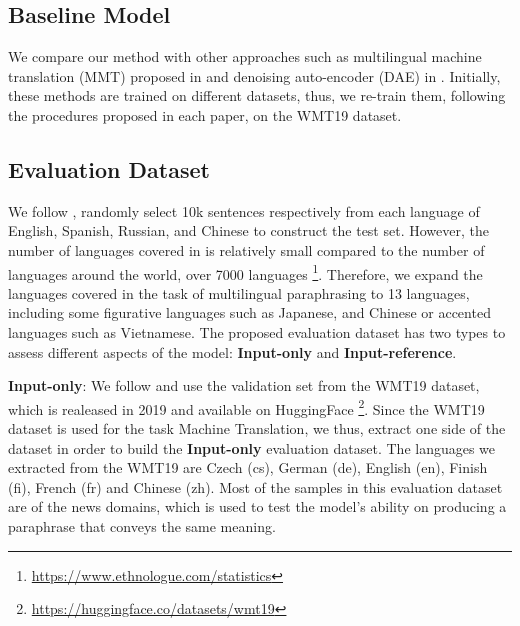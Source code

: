 \documentclass[letterpaper]{article} %
\begin{document}
\subsection{Baseline Model}
We compare our method with other approaches such as multilingual machine translation (MMT) proposed in \citet{thompson-post-2020-paraphrase} and denoising auto-encoder (DAE) in \citet{guo2019zeroshot}. Initially, these methods are trained on different datasets, thus, we re-train them, following the procedures proposed in each paper, on the WMT19 dataset. %

\subsection{Evaluation Dataset}
We follow \citet{guo2019zeroshot}, randomly select 10k sentences respectively from each language of English, Spanish, Russian, and Chinese to construct the test set. However, the number of languages covered in \citet{guo2019zeroshot} is relatively small compared to the number of languages around the world, over 7000 languages \footnote{\url{https://www.ethnologue.com/statistics}}. Therefore, we expand the languages covered in the task of multilingual paraphrasing to 13 languages, including some figurative languages such as Japanese, and Chinese or accented languages such as Vietnamese. The proposed evaluation dataset has two types to assess different aspects of the model: \textbf{Input-only} and \textbf{Input-reference}.

\textbf{Input-only}: We follow \citet{thompson-post-2020-paraphrase} and use the validation set from the WMT19 dataset, which is realeased in 2019 and available on HuggingFace \footnote{\url{https://huggingface.co/datasets/wmt19}}. Since the WMT19 dataset is used for the task Machine Translation, we thus, extract one side of the dataset in order to build the \textbf{Input-only} evaluation dataset. The languages we extracted from the WMT19 are Czech (cs), German (de), English (en), Finish (fi), French (fr) and Chinese (zh). Most of the samples in this evaluation dataset are of the news domains, which is used to test the model's ability on producing a paraphrase that conveys the same meaning.
\end{document}
